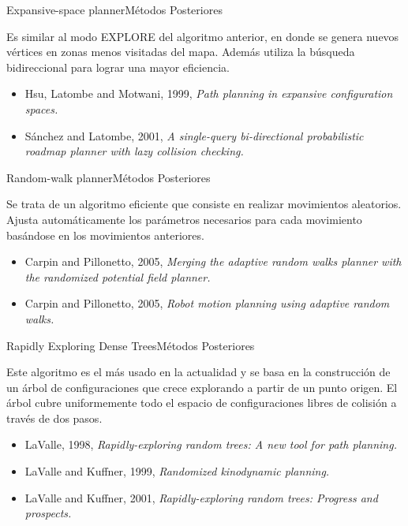 \documentclass{beamer}
\begin{document}
\begin{frame}{Expansive-space planner}{Métodos Posteriores}

Es similar al modo EXPLORE del algoritmo anterior, en donde se genera nuevos vértices en zonas menos visitadas del mapa. Además utiliza la búsqueda bidireccional para lograr una mayor eficiencia.

\begin{itemize}
\item Hsu, Latombe and Motwani, 1999, \textit{Path planning in expansive configuration spaces.}
\item Sánchez and Latombe, 2001, \textit{A single-query bi-directional probabilistic roadmap planner with lazy collision checking.}
\end{itemize}
\end{frame}

\begin{frame}{Random-walk planner}{Métodos Posteriores}

Se trata de un algoritmo eficiente que consiste en realizar movimientos aleatorios. Ajusta automáticamente los parámetros necesarios para cada movimiento basándose en los movimientos anteriores.

\begin{itemize}
	\item Carpin and Pillonetto, 2005, \textit{Merging the adaptive random walks planner with the randomized potential field planner.}
	\item Carpin and Pillonetto, 2005, \textit{Robot motion planning using adaptive random walks.}
\end{itemize}
\end{frame}

\begin{frame}{Rapidly Exploring Dense Trees}{Métodos Posteriores}

Este algoritmo es el más usado en la actualidad y se basa en la construcción de un árbol de configuraciones que crece explorando a partir de un punto origen. El árbol cubre uniformemente todo el espacio de configuraciones libres de colisión a través de dos pasos.

\begin{itemize}
	\item LaValle, 1998, \textit{Rapidly-exploring random trees: A new tool for path planning.}
	\item LaValle and Kuffner, 1999, \textit{Randomized kinodynamic planning.}
	\item LaValle and Kuffner, 2001, \textit{Rapidly-exploring random trees: Progress and prospects.}
\end{itemize}
\end{frame}
\end{document}
